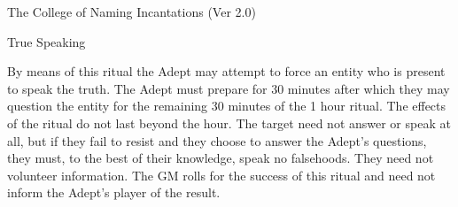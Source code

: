 \begin{Chapter}{The College of Naming Incantations (Ver 2.0)}
\begin{ritual}[R-7]{True Speaking}
\begin{effects}
By means of this ritual the Adept may attempt to force an entity who
is present to speak the truth.  The Adept must prepare for 30 minutes
after which they may question the entity for the remaining 30 minutes
of the 1 hour ritual.  The effects of the ritual do not last beyond
the hour.  The target need not answer or speak at all, but if they
fail to resist and they choose to answer the Adept’s questions, they
must, to the best of their knowledge, speak no falsehoods.  They need
not volunteer information.  The GM rolls for the success of this
ritual and need not inform the Adept’s player of the result.
\end{effects}
\end{ritual}
\end{Chapter}
